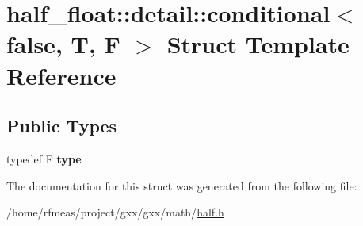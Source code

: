 \hypertarget{structhalf__float_1_1detail_1_1conditional_3_01false_00_01T_00_01F_01_4}{}\section{half\+\_\+float\+:\+:detail\+:\+:conditional$<$ false, T, F $>$ Struct Template Reference}
\label{structhalf__float_1_1detail_1_1conditional_3_01false_00_01T_00_01F_01_4}
\subsection*{Public Types}
\begin{DoxyCompactItemize}
\item 
typedef F {\bfseries type}\hypertarget{structhalf__float_1_1detail_1_1conditional_3_01false_00_01T_00_01F_01_4_ac15c7cd8869102e198302214fc278630}{}\label{structhalf__float_1_1detail_1_1conditional_3_01false_00_01T_00_01F_01_4_ac15c7cd8869102e198302214fc278630}

\end{DoxyCompactItemize}


The documentation for this struct was generated from the following file\+:\begin{DoxyCompactItemize}
\item 
/home/rfmeas/project/gxx/gxx/math/\hyperlink{half_8h}{half.\+h}\end{DoxyCompactItemize}

